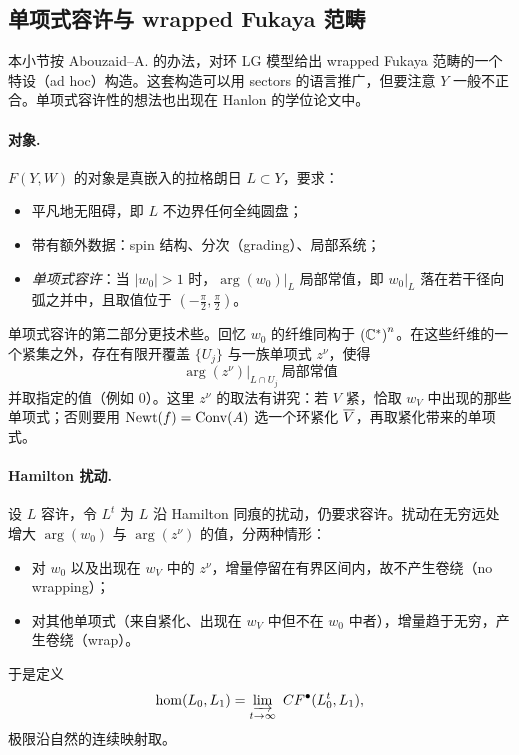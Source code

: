 \subsection{单项式容许与 wrapped Fukaya 范畴}

本小节按 Abouzaid--A. 的办法，对环 LG 模型给出 wrapped Fukaya 范畴的一个特设（ad hoc）构造。这套构造可以用 sectors 的语言推广，但要注意 $Y$ 一般不正合。单项式容许性的想法也出现在 Hanlon 的学位论文中。

\paragraph{对象.} $F(Y,W)$ 的对象是真嵌入的拉格朗日 $L\subset Y$，要求：
\begin{itemize}
  \item 平凡地无阻碍，即 $L$ 不边界任何全纯圆盘；
  \item 带有额外数据：spin 结构、分次（grading）、局部系统；
  \item \emph{单项式容许}：当 $|w_0|>1$ 时，$\arg(w_0)|_L$ 局部常值，即 $w_0|_L$ 落在若干径向弧之并中，且取值位于 $\left(-\frac{\pi}{2},\frac{\pi}{2}\right)$。
\end{itemize}

单项式容许的第二部分更技术些。回忆 $w_0$ 的纤维同构于 $\left(\mathbb{C}^*\right)^n$。在这些纤维的一个紧集之外，存在有限开覆盖 $\{U_j\}$ 与一族单项式 $z^\nu$，使得
\[
\arg(z^\nu)\big|_{L\cap U_j}\ \text{局部常值}
\]
并取指定的值（例如 $0$）。这里 $z^\nu$ 的取法有讲究：若 $V$ 紧，恰取 $w_V$ 中出现的那些单项式；否则要用 $\operatorname{Newt}(f)=\operatorname{Conv}(A)$ 选一个环紧化 $\overline V$，再取紧化带来的单项式。

\paragraph{Hamilton 扰动.} 设 $L$ 容许，令 $L^t$ 为 $L$ 沿 Hamilton 同痕的扰动，仍要求容许。扰动在无穷远处增大 $\arg(w_0)$ 与 $\arg(z^\nu)$ 的值，分两种情形：
\begin{itemize}
  \item 对 $w_0$ 以及出现在 $w_V$ 中的 $z^\nu$，增量停留在有界区间内，故不产生卷绕（no wrapping）；
  \item 对其他单项式（来自紧化、出现在 $w_V$ 中但不在 $w_0$ 中者），增量趋于无穷，产生卷绕（wrap）。
\end{itemize}
于是定义
\[
\hom(L_0,L_1)=\varinjlim_{t\to\infty}\ CF^\bullet(L_0^t,L_1),
\]
极限沿自然的连续映射取。

